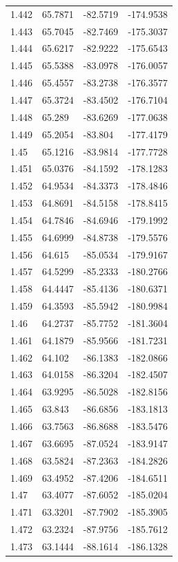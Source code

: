 \begin{tabular}{llll}
1.442 & 65.7871 & -82.5719 & -174.9538 \\
1.443 & 65.7045 & -82.7469 & -175.3037 \\
1.444 & 65.6217 & -82.9222 & -175.6543 \\
1.445 & 65.5388 & -83.0978 & -176.0057 \\
1.446 & 65.4557 & -83.2738 & -176.3577 \\
1.447 & 65.3724 & -83.4502 & -176.7104 \\
1.448 & 65.289 & -83.6269 & -177.0638 \\
1.449 & 65.2054 & -83.804 & -177.4179 \\
1.45 & 65.1216 & -83.9814 & -177.7728 \\
1.451 & 65.0376 & -84.1592 & -178.1283 \\
1.452 & 64.9534 & -84.3373 & -178.4846 \\
1.453 & 64.8691 & -84.5158 & -178.8415 \\
1.454 & 64.7846 & -84.6946 & -179.1992 \\
1.455 & 64.6999 & -84.8738 & -179.5576 \\
1.456 & 64.615 & -85.0534 & -179.9167 \\
1.457 & 64.5299 & -85.2333 & -180.2766 \\
1.458 & 64.4447 & -85.4136 & -180.6371 \\
1.459 & 64.3593 & -85.5942 & -180.9984 \\
1.46 & 64.2737 & -85.7752 & -181.3604 \\
1.461 & 64.1879 & -85.9566 & -181.7231 \\
1.462 & 64.102 & -86.1383 & -182.0866 \\
1.463 & 64.0158 & -86.3204 & -182.4507 \\
1.464 & 63.9295 & -86.5028 & -182.8156 \\
1.465 & 63.843 & -86.6856 & -183.1813 \\
1.466 & 63.7563 & -86.8688 & -183.5476 \\
1.467 & 63.6695 & -87.0524 & -183.9147 \\
1.468 & 63.5824 & -87.2363 & -184.2826 \\
1.469 & 63.4952 & -87.4206 & -184.6511 \\
1.47 & 63.4077 & -87.6052 & -185.0204 \\
1.471 & 63.3201 & -87.7902 & -185.3905 \\
1.472 & 63.2324 & -87.9756 & -185.7612 \\
1.473 & 63.1444 & -88.1614 & -186.1328 \\

\end{tabular}
